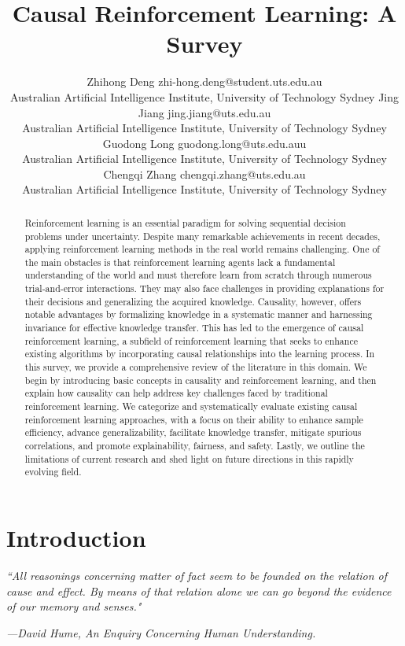 \documentclass[10pt]{article} %
\title{Causal Reinforcement Learning: A Survey}
\author{\name Zhihong Deng \email zhi-hong.deng@student.uts.edu.au \\
      \addr Australian Artificial Intelligence Institute, University of Technology Sydney
      \AND
      \name Jing Jiang \email jing.jiang@uts.edu.au \\
      \addr Australian Artificial Intelligence Institute, University of Technology Sydney
      \AND
      \name Guodong Long \email guodong.long@uts.edu.auu \\
      \addr Australian Artificial Intelligence Institute, University of Technology Sydney
      \AND
      \name Chengqi Zhang \email chengqi.zhang@uts.edu.au \\
      \addr Australian Artificial Intelligence Institute, University of Technology Sydney}
\theoremstyle{definition}
\begin{document}
\maketitle

%
%
\begin{abstract}
Reinforcement learning is an essential paradigm for solving sequential decision problems under uncertainty. 
Despite many remarkable achievements in recent decades, applying reinforcement learning methods in the real world remains challenging. One of the main obstacles is that reinforcement learning agents lack a fundamental understanding of the world and must therefore learn from scratch through numerous trial-and-error interactions. 
They may also face challenges in providing explanations for their decisions and generalizing the acquired knowledge. 
Causality, however, offers notable advantages by formalizing knowledge in a systematic manner and harnessing invariance for effective knowledge transfer. 
This has led to the emergence of causal reinforcement learning, a subfield of reinforcement learning that seeks to enhance existing algorithms by incorporating causal relationships into the learning process. 
In this survey, we provide a comprehensive review of the literature in this domain. 
We begin by introducing basic concepts in causality and reinforcement learning, and then explain how causality can help address key challenges faced by traditional reinforcement learning. 
We categorize and systematically evaluate existing causal reinforcement learning approaches, with a focus on their ability to enhance sample efficiency, advance generalizability, facilitate knowledge transfer, mitigate spurious correlations, and promote explainability, fairness, and safety.
Lastly, we outline the limitations of current research and shed light on future directions in this rapidly evolving field.
\end{abstract}

%
%
\section{Introduction}
\setlength{\epigraphwidth}{.9\columnwidth}
\renewcommand{\epigraphflush}{center}
\renewcommand{\textflush}{flushepinormal}
\epigraph{\textit{``All reasonings concerning matter of fact seem to be founded on the relation of cause and effect. By means of that relation alone we can go beyond the evidence of our memory and senses."} }
{{\footnotesize{\textit{---David Hume, An Enquiry Concerning Human Understanding.}}}}
\end{document}
